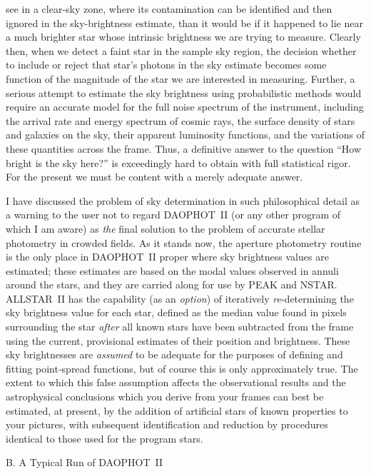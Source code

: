 see in a clear-sky zone, where its contamination can be identified and
then ignored in the sky-brightness estimate, than it would be if it
happened to lie near a much brighter star whose intrinsic brightness we
are trying to measure. Clearly then, when we detect a faint star in the
sample sky region, the decision whether to include or reject that
star's photons in the sky estimate becomes some function of the
magnitude of the star we are interested in measuring.  Further, a
serious attempt to estimate the sky brightness using probabilistic
methods would require an accurate model for the full noise spectrum of
the instrument, including the arrival rate and energy spectrum of
cosmic rays, the surface density of stars and galaxies on the sky,
their apparent luminosity functions, and the variations of these
quantities across the frame. Thus, a definitive answer to the question
``How bright is the sky here?'' is exceedingly hard to obtain with full
statistical rigor. For the present we must be content with a merely
adequate answer.

I have discussed the problem of sky determination in such philosophical
detail as a warning to the user not to regard DAOPHOT~II (or any other
program of which I am aware) as {\it the\/} final solution to the
problem of accurate stellar photometry in crowded fields.  As it stands
now, the aperture photometry routine is the only place in DAOPHOT~II
proper where sky brightness values are estimated; these estimates are
based on the modal values observed in annuli around the stars, and they
are carried along for use by PEAK and NSTAR.  ALLSTAR~II has the
capability (as an {\it option\/}) of iteratively {\it re\/}-determining
the sky brightness value for each star, defined as the median value
found in pixels surrounding the star {\it after\/} all known stars have
been subtracted from the frame using the current, provisional estimates
of their position and brightness.  These sky brightnesses are {\it
assumed\/} to be adequate for the purposes of defining and fitting
point-spread functions, but of course this is only approximately true.
The extent to which this false assumption affects the observational
results and the astrophysical conclusions which you derive from your
frames can best be estimated, at present, by the addition of artificial
stars of known properties to your pictures, with subsequent
identification and reduction by procedures identical to those used for
the program stars.

\vfill
\eject
\centerline{B.  A Typical Run of DAOPHOT~II} 

